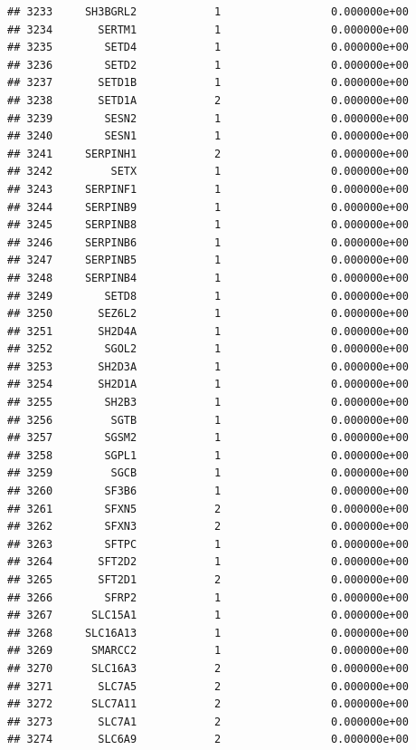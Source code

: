 \documentclass[
]{article}
\begin{document}
\begin{verbatim}
## 3233     SH3BGRL2            1                 0.000000e+00
## 3234       SERTM1            1                 0.000000e+00
## 3235        SETD4            1                 0.000000e+00
## 3236        SETD2            1                 0.000000e+00
## 3237       SETD1B            1                 0.000000e+00
## 3238       SETD1A            2                 0.000000e+00
## 3239        SESN2            1                 0.000000e+00
## 3240        SESN1            1                 0.000000e+00
## 3241     SERPINH1            2                 0.000000e+00
## 3242         SETX            1                 0.000000e+00
## 3243     SERPINF1            1                 0.000000e+00
## 3244     SERPINB9            1                 0.000000e+00
## 3245     SERPINB8            1                 0.000000e+00
## 3246     SERPINB6            1                 0.000000e+00
## 3247     SERPINB5            1                 0.000000e+00
## 3248     SERPINB4            1                 0.000000e+00
## 3249        SETD8            1                 0.000000e+00
## 3250       SEZ6L2            1                 0.000000e+00
## 3251       SH2D4A            1                 0.000000e+00
## 3252        SGOL2            1                 0.000000e+00
## 3253       SH2D3A            1                 0.000000e+00
## 3254       SH2D1A            1                 0.000000e+00
## 3255        SH2B3            1                 0.000000e+00
## 3256         SGTB            1                 0.000000e+00
## 3257        SGSM2            1                 0.000000e+00
## 3258        SGPL1            1                 0.000000e+00
## 3259         SGCB            1                 0.000000e+00
## 3260        SF3B6            1                 0.000000e+00
## 3261        SFXN5            2                 0.000000e+00
## 3262        SFXN3            2                 0.000000e+00
## 3263        SFTPC            1                 0.000000e+00
## 3264       SFT2D2            1                 0.000000e+00
## 3265       SFT2D1            2                 0.000000e+00
## 3266        SFRP2            1                 0.000000e+00
## 3267      SLC15A1            1                 0.000000e+00
## 3268     SLC16A13            1                 0.000000e+00
## 3269      SMARCC2            1                 0.000000e+00
## 3270      SLC16A3            2                 0.000000e+00
## 3271       SLC7A5            2                 0.000000e+00
## 3272      SLC7A11            2                 0.000000e+00
## 3273       SLC7A1            2                 0.000000e+00
## 3274       SLC6A9            2                 0.000000e+00

\end{verbatim}
\end{document}
